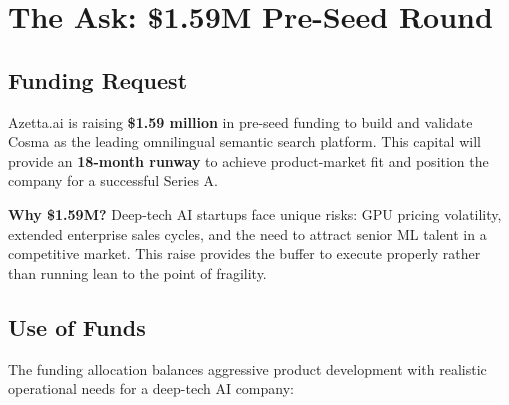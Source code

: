 \section{The Ask: \$1.59M Pre-Seed Round}

\subsection{Funding Request}

Azetta.ai is raising \textbf{\$1.59 million} in pre-seed funding to build and validate Cosma as the leading omnilingual semantic search platform. This capital will provide an \textbf{18-month runway} to achieve product-market fit and position the company for a successful Series A.

\textbf{Why \$1.59M?} Deep-tech AI startups face unique risks: GPU pricing volatility, extended enterprise sales cycles, and the need to attract senior ML talent in a competitive market. This raise provides the buffer to execute properly rather than running lean to the point of fragility.

\subsection{Use of Funds}

The funding allocation balances aggressive product development with realistic operational needs for a deep-tech AI company:

